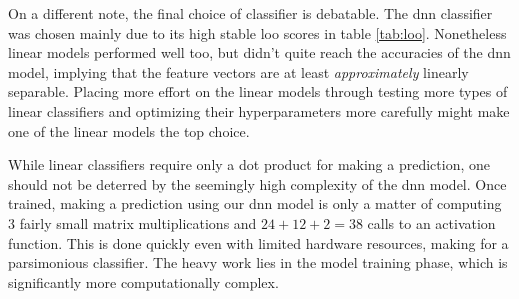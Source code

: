 
On a different note, the final choice of classifier is debatable. The \gls{dnn} classifier was chosen mainly due to its high stable \gls{loo} scores in table \ref{tab:loo}. Nonetheless linear models performed well too, but didn't quite reach the accuracies of the \gls{dnn} model, implying that the feature vectors are at least \emph{approximately} linearly separable. Placing more effort on the linear models through testing more types of linear classifiers and optimizing their hyperparameters more carefully might make one of the linear models the top choice. 

While linear classifiers require only a dot product for making a prediction, one should not be deterred by the seemingly high complexity of the \gls{dnn} model. Once trained, making a prediction using our \gls{dnn} model is only a matter of computing 3 fairly small matrix multiplications and $24+12+2=38$ calls to an activation function. This is done quickly even with limited hardware resources, making for a parsimonious classifier. The heavy work lies in the model training phase, which is significantly more computationally complex.


